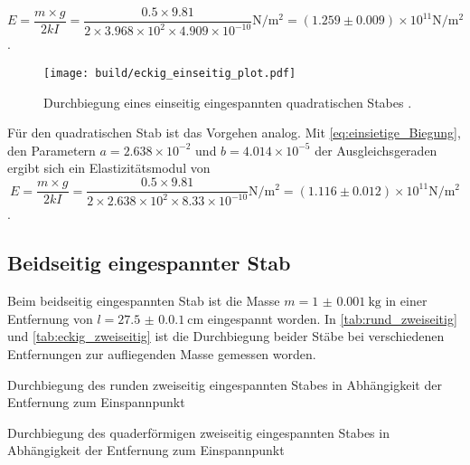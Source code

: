 \begin{equation*}
  E=\frac{m \times g}{2kI} = \frac{0.5 \times 9.81}{2 \times 3.968 \times 10^{2} \times 4.909 \times 10^{-10}} \unit{\newton\per\meter\squared} = (1.259 \pm 0.009) \times 10^{11} \unit{\newton\per\meter\squared}
\end{equation*}.


\begin{figure}[H]
  \centering
  \texttt{[image: build/eckig\_einseitig\_plot.pdf]}
  \caption{Durchbiegung eines einseitig eingespannten quadratischen Stabes \cite{V103}.}
  \label{fig:Stab_eckig}
\end{figure}

\noindent Für den quadratischen Stab ist das Vorgehen analog. Mit \autoref{eq:einsietige_Biegung}, den Parametern $a=2.638 \times 10^{-2}$ und $b=4.014 \times 10^{-5}$ der Ausgleichsgeraden ergibt sich ein Elastizitätsmodul von
\begin{equation*}
  E=\frac{m \times g}{2kI} = \frac{0.5 \times 9.81}{2 \times 2.638 \times 10^{2} \times 8.33 \times 10^{-10}} \unit{\newton\per\meter\squared} = (1.116 \pm 0.012) \times 10^{11} \unit{\newton\per\meter\squared}
\end{equation*}.

\subsection{Beidseitig eingespannter Stab}

Beim beidseitig eingespannten Stab ist die Masse $m=\qty{1(0.001)}{\kilo\gram}$ in einer Entfernung von $l=\qty{27.5(0.01)}{\centi\meter}$
eingespannt worden. In \autoref{tab:rund_zweiseitig} und \autoref{tab:eckig_zweiseitig} ist die Durchbiegung beider Stäbe bei verschiedenen Entfernungen zur
aufliegenden Masse gemessen worden.

\begin{table}[H]
  \centering
  \begin{minipage}[b]{0.5\textwidth}
    \centering
    
    \caption{Durchbiegung des runden zweiseitig eingespannten Stabes in Abhängigkeit der Entfernung zum Einspannpunkt}
    \label{tab:rund_zweiseitig}
  \end{minipage}
  \hfill
  \begin{minipage}[b]{0.5\textwidth}
    \centering
    
    \caption{Durchbiegung des quaderförmigen zweiseitig eingespannten Stabes in Abhängigkeit der Entfernung zum Einspannpunkt}
    \label{tab:eckig_zweiseitig}
  \end{minipage}
\end{table}

